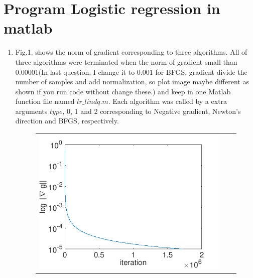 \documentclass{article}
\renewcommand{\mathbf}{\boldsymbol}
\newcommand{\mb}{\mathbf}
\newcommand{\matlab}[1]{\texttt{#1}}
\begin{document}
\section{Program Logistic regression in matlab} 
\begin{enumerate}[(1)]
\item Fig.1. shows the norm of gradient corresponding to three algorithms. All of three algorithms were terminated when the norm of gradient small than 0.00001(In last question, I change it to 0.001 for BFGS, gradient divide the number of samples and add normalization, so plot image maybe different as shown if you run code without change these.) and keep in one Matlab function file named $lr\_lindq.m$. Each algorithm was called by a extra arguments $type$, 0, 1 and 2 corresponding to Negative gradient, Newton’s direction and BFGS, respectively.
\begin{figure}[htb]
\centering
  \begin{tabular}{@{}ccc@{}}
    \includegraphics[width=.33\textwidth]{hw3_0.png} &

\end{tabular}
\end{figure}
\end{enumerate}
\end{document}
